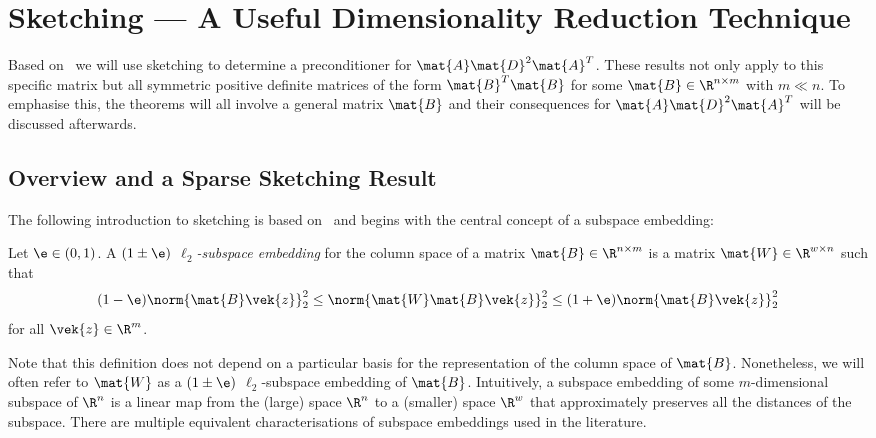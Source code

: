 \chapter{Sketching --- A Useful Dimensionality Reduction Technique}\label{chap:sketching}

Based on~\cite{Avron-FasterRandomizedInfeasibleIPMs} we will use sketching to determine a preconditioner for \(\mat{A} \mat{D}^2 \mat{A}^T\).
These results not only apply to this specific matrix but all symmetric positive definite matrices of the form \(\mat{B}^T \mat{B}\) for some \(\mat{B} \in \R^{n \times m}\) with \(m \ll n\).
To emphasise this, the theorems will all involve a general matrix \(\mat{B}\) and their consequences for \(\mat{A}\mat{D}^2\mat{A}^T\) will be discussed afterwards.

\section{Overview and a Sparse Sketching Result}\label{sec:sketching-overview}

The following introduction to sketching is based on~\cite{Woodruff-Sketching} and begins with the central concept of a subspace embedding:
\begin{definition}\label{def:subspace-embedding}
Let \(\e \in (0, 1)\). A \emph{\((1 \pm \e)\) \(\ell_2\)-subspace embedding} for the column space of a matrix \(\mat{B} \in \R^{n \times m}\) is a matrix \(\mat{W} \in \R^{w \times n}\) such that
\[ (1-\e) \norm{\mat{B}\vek{z}}_2^2 \leq \norm{\mat{W}\mat{B}\vek{z}}_2^2 \leq (1+\e)\norm{\mat{B}\vek{z}}_2^2 \]
for all \(\vek{z} \in \R^m\).
\end{definition}
Note that this definition does not depend on a particular basis for the representation of the column space of \(\mat{B}\).
Nonetheless, we will often refer to \(\mat{W}\) as a \((1\pm\e)\) \(\ell_2\)-subspace embedding of \(\mat{B}\).
Intuitively, a subspace embedding of some \(m\)-dimensional subspace of \(\R^n\) is a linear map from the (large) space \(\R^n\) to a (smaller) space \(\R^w\) that approximately preserves all the distances of the subspace.
There are multiple equivalent characterisations of subspace embeddings used in the literature.

